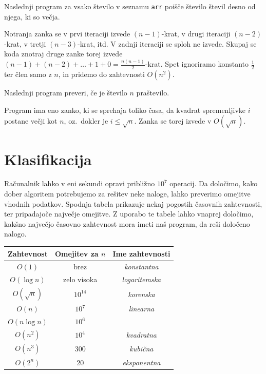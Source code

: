 \documentclass{book}
\begin{document}
\newpage
\begin{examples}

  Naslednji program za vsako število v seznamu \verb+arr+ poišče število števil desno od njega, ki so večja.


  Notranja zanka se v prvi iteraciji izvede \((n-1)\)-krat, v drugi iteraciji
  \((n-2)\)-krat, v tretji \((n-3)\)-krat, itd. V zadnji iteraciji se sploh ne
  izvede. Skupaj se koda znotraj druge zanke torej izvede
  \((n-1) + (n-2) + \ldots + 1 + 0 = \frac{n(n-1)}{2}\)-krat. Spet ignoriramo
  konstanto \(\frac{1}{2}\) ter člen samo z \(n\), in pridemo do zahtevnosti
  \(O(n^2)\).

\end{examples}

\begin{examples}

  Naslednji program preveri, če je število \(n\) praštevilo.


  Program ima eno zanko, ki se sprehaja toliko časa, da kvadrat spremenljivke
  \(i\) postane večji kot \(n\), oz.~dokler je \(i \le \sqrt{n}\). Zanka se torej
  izvede v \(O(\sqrt{n})\).

\end{examples}

\newpage
\section{Klasifikacija}

Računalnik lahko v eni sekundi opravi približno \(10^7\) operacij. Da določimo,
kako dober algoritem potrebujemo za rešitev neke naloge, lahko preverimo
omejitve vhodnih podatkov. Spodnja tabela prikazuje nekaj pogostih časovnih
zahtevnosti, ter pripadajoče največje omejitve. Z uporabo te tabele lahko
vnaprej določimo, kakšno največjo časovno zahtevnost mora imeti naš program,
da reši določeno nalogo.

\begin{table}[h!]
  \centering
  \begin{tabular}{|c|c|c|}
	\hline
	Zahtevnost & Omejitev za \(n\) & Ime zahtevnosti \\
	\hline
	\(O(1)\) & brez & \emph{konstantna} \\
	\(O(\log n)\) & zelo visoka & \emph{logaritemska} \\
	\(O(\sqrt{n})\) & \(10^{14}\) & \emph{korenska} \\
	\(O(n)\) & \(10^7\) & \emph{linearna} \\
	\(O(n \log n)\) & \(10^6\) & \\
	\(O(n^2)\) & \(10^4\) & \emph{kvadratna} \\
	\(O(n^3)\) & \(300\) & \emph{kubična} \\
	\(O(2^n)\) & \(20\) & \emph{eksponentna} \\
	\hline
  \end{tabular}
\end{table}
\end{document}
